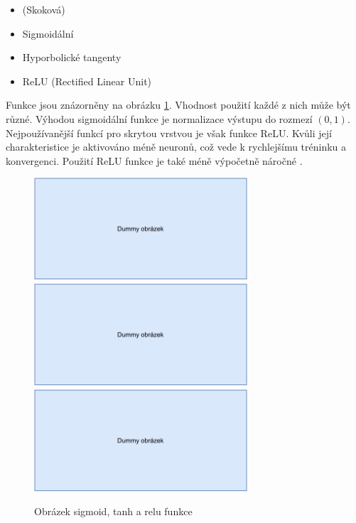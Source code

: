 \begin{itemize}
    \item (Skoková)
    \item Sigmoidální
    \item Hyporbolické tangenty
    \item ReLU (Rectified Linear Unit)
\end{itemize}

Funkce jsou znázorněny na obrázku \ref{aktivacni_funkce}. Vhodnost použití každé z nich může být různé. Výhodou sigmoidální funkce je normalizace výstupu do rozmezí $(0,1)$. Nejpoužívanější funkcí pro skrytou vrstvou je však funkce ReLU. Kvůli její charakteristice je aktivováno méně neuronů, což vede k rychlejšímu tréninku a konvergenci. Použití ReLU funkce je také méně výpočetně náročné \cite{medium:activation_function}.


\begin{figure}[hbt]
	\centering
	\includegraphics[width=0.33\linewidth, height=1.5in]{obrazky/dummy_pic.pdf}\hfill
	\includegraphics[width=0.33\linewidth, height=1.5in]{obrazky/dummy_pic.pdf}\hfill
	\includegraphics[width=0.33\linewidth, height=1.5in]{obrazky/dummy_pic.pdf}\hfill
	\caption{Obrázek sigmoid, tanh a relu funkce}
	\label{aktivacni_funkce}
\end{figure}


